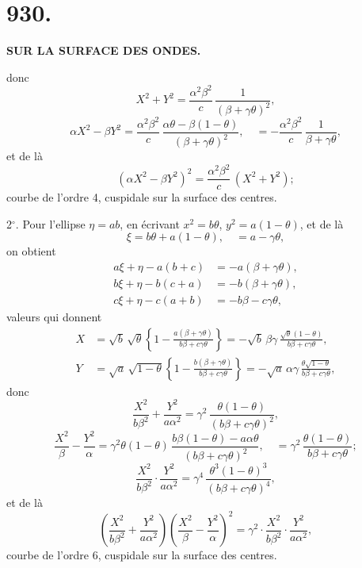 \documentclass[11pt,a4paper]{article}
\newcommand{\paper}[2]{\section*{#1.} \begin{center}\textbf{#2}\end{center}}
\begin{document}
\setcounter{page}{251}

\paper{930}{SUR LA SURFACE DES ONDES.}

\begin{flushright}
\end{flushright}

donc
\[
X^2 + Y^2 = \frac{\alpha^2\beta^2}{c}\,\frac{1}{(\beta+\gamma\theta)^2},
\]
\[
\alpha X^2 - \beta Y^2 = \frac{\alpha^2\beta^2}{c}\,\frac{\alpha\theta - \beta(1-\theta)}{(\beta+\gamma\theta)^2},
\quad = -\frac{\alpha^2\beta^2}{c}\,\frac{1}{\beta+\gamma\theta},
\]
et de l\`a
\[
(\alpha X^2 - \beta Y^2)^2 = \frac{\alpha^2\beta^2}{c}\,(X^2 + Y^2);
\]
courbe de l'ordre 4, cuspidale sur la surface des centres.

2$^\circ$. Pour l'ellipse $\eta = ab$, en \'ecrivant $x^2 = b\theta$, $y^2 = a(1-\theta)$, et de l\`a
\[
\xi = b\theta + a(1-\theta), \quad = a - \gamma\theta,
\]
on obtient
\begin{align*}
a\xi + \eta - a(b+c) &= -a(\beta + \gamma\theta), \\
b\xi + \eta - b(c+a) &= -b(\beta + \gamma\theta), \\
c\xi + \eta - c(a+b) &= -b\beta - c\gamma\theta,
\end{align*}
valeurs qui donnent
\begin{align*}
X &= \sqrt{b}\,\sqrt{\theta}\left\{1 - \frac{a(\beta+\gamma\theta)}{b\beta+c\gamma\theta}\right\}
= -\sqrt{b}\,\beta\gamma\,\frac{\sqrt{\theta}(1-\theta)}{b\beta+c\gamma\theta},\\
Y &= \sqrt{a}\,\sqrt{1-\theta}\left\{1 - \frac{b(\beta+\gamma\theta)}{b\beta+c\gamma\theta}\right\}
= -\sqrt{a}\,\alpha\gamma\,\frac{\theta\sqrt{1-\theta}}{b\beta+c\gamma\theta},
\end{align*}
donc
\[
\frac{X^2}{b\beta^2} + \frac{Y^2}{a\alpha^2}
= \gamma^2\,\frac{\theta(1-\theta)}{(b\beta+c\gamma\theta)^2},
\]
\[
\frac{X^2}{\beta} - \frac{Y^2}{\alpha}
= \gamma^2\theta(1-\theta)\,\frac{b\beta(1-\theta)-a\alpha\theta}{(b\beta+c\gamma\theta)^2},
\quad = \gamma^2\,\frac{\theta(1-\theta)}{b\beta+c\gamma\theta};
\]
\[
\frac{X^2}{b\beta^2}\cdot\frac{Y^2}{a\alpha^2}
= \gamma^4\,\frac{\theta^3(1-\theta)^3}{(b\beta+c\gamma\theta)^4},
\]
et de l\`a
\[
\left(\frac{X^2}{b\beta^2} + \frac{Y^2}{a\alpha^2}\right)
\left(\frac{X^2}{\beta} - \frac{Y^2}{\alpha}\right)^2
= \gamma^2\cdot\frac{X^2}{b\beta^2}\cdot\frac{Y^2}{a\alpha^2},
\]
courbe de l'ordre 6, cuspidale sur la surface des centres.
\end{document}
